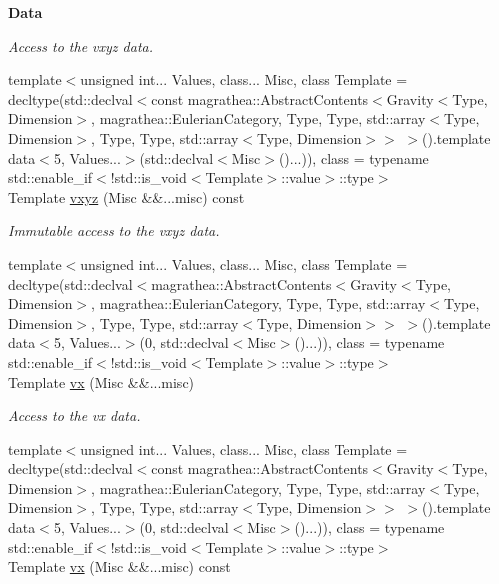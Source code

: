 \begin{Indent}{\bf Data}
\begin{DoxyCompactItemize}
\begin{DoxyCompactList}\small\item\em Access to the vxyz data. \end{DoxyCompactList}\item 
{\footnotesize template$<$unsigned int... Values, class... Misc, class Template  = decltype(std\-::declval$<$const magrathea\-::\-Abstract\-Contents$<$\-Gravity$<$\-Type, Dimension$>$, magrathea\-::\-Eulerian\-Category, Type, Type, std\-::array$<$\-Type, Dimension$>$, Type, Type, std\-::array$<$\-Type, Dimension$>$$>$ $>$().\-template data$<$5, Values...$>$(std\-::declval$<$\-Misc$>$()...)), class  = typename std\-::enable\-\_\-if$<$!std\-::is\-\_\-void$<$\-Template$>$\-::value$>$\-::type$>$ }\\Template \hyperlink{exceptionGravity_a3746f229229b36e240a814f560413dda}{vxyz} (Misc \&\&...misc) const 
\begin{DoxyCompactList}\small\item\em Immutable access to the vxyz data. \end{DoxyCompactList}\item 
{\footnotesize template$<$unsigned int... Values, class... Misc, class Template  = decltype(std\-::declval$<$magrathea\-::\-Abstract\-Contents$<$\-Gravity$<$\-Type, Dimension$>$, magrathea\-::\-Eulerian\-Category, Type, Type, std\-::array$<$\-Type, Dimension$>$, Type, Type, std\-::array$<$\-Type, Dimension$>$$>$ $>$().\-template data$<$5, Values...$>$(0, std\-::declval$<$\-Misc$>$()...)), class  = typename std\-::enable\-\_\-if$<$!std\-::is\-\_\-void$<$\-Template$>$\-::value$>$\-::type$>$ }\\Template \hyperlink{exceptionGravity_a9c258849c389c80b17bec925689f95a4}{vx} (Misc \&\&...misc)
\begin{DoxyCompactList}\small\item\em Access to the vx data. \end{DoxyCompactList}\item 
{\footnotesize template$<$unsigned int... Values, class... Misc, class Template  = decltype(std\-::declval$<$const magrathea\-::\-Abstract\-Contents$<$\-Gravity$<$\-Type, Dimension$>$, magrathea\-::\-Eulerian\-Category, Type, Type, std\-::array$<$\-Type, Dimension$>$, Type, Type, std\-::array$<$\-Type, Dimension$>$$>$ $>$().\-template data$<$5, Values...$>$(0, std\-::declval$<$\-Misc$>$()...)), class  = typename std\-::enable\-\_\-if$<$!std\-::is\-\_\-void$<$\-Template$>$\-::value$>$\-::type$>$ }\\Template \hyperlink{exceptionGravity_a2820a2282f768fa7ba04175a6d1f17cb}{vx} (Misc \&\&...misc) const 

\end{DoxyCompactItemize}
\end{Indent}

